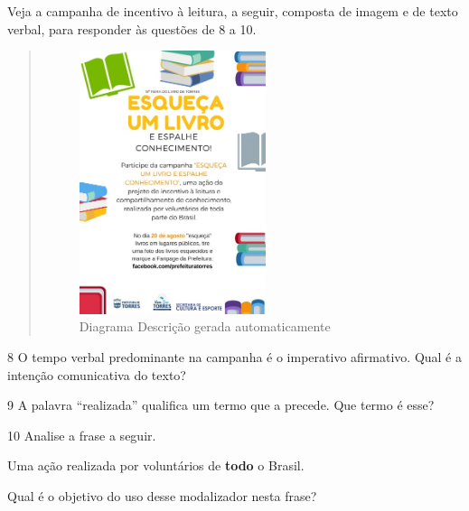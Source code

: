 Veja a campanha de incentivo à leitura, a seguir, composta de imagem e
de texto verbal, para responder às questões de 8 a 10.

\begin{quote}
\begin{figure}[H]
\centering\includegraphics[width=2.14842in,height=3.03846in]{./imgSAEB_6_POR/media/image25.jpeg}
\caption{Diagrama Descrição gerada automaticamente}
\end{figure}

\end{quote}

\num{8} O tempo verbal predominante na campanha é o imperativo
afirmativo. Qual é a intenção comunicativa do texto?


\num{9} A palavra ``realizada'' qualifica um termo que a precede. Que
termo é esse?\EP[1]


\num{10} Analise a frase a seguir.\enlargethispage{\baselineskip}

\begin{myquote}
Uma ação realizada por voluntários de \textbf{{todo}} o Brasil.
\end{myquote}

\noindent Qual é o objetivo do uso desse modalizador nesta frase?


